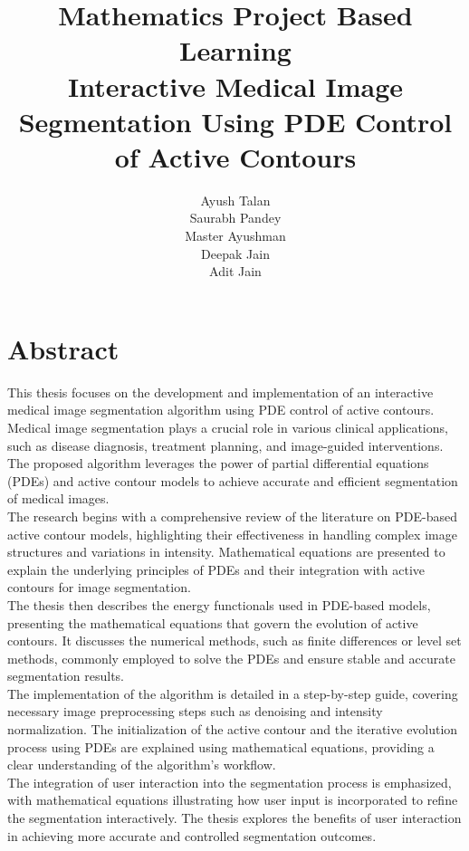 \documentclass[]{report}
\title{Mathematics Project Based Learning\\
{\Large Interactive Medical Image Segmentation Using
PDE Control of Active Contours}
}
\author{Ayush Talan\\Saurabh Pandey\\Master Ayushman\\Deepak Jain\\Adit Jain}
\begin{document}
\maketitle
\chapter*{Abstract}

This thesis focuses on the development and implementation of an interactive medical image segmentation algorithm using PDE control of active contours. Medical image segmentation plays a crucial role in various clinical applications, such as disease diagnosis, treatment planning, and image-guided interventions. The proposed algorithm leverages the power of partial differential equations (PDEs) and active contour models to achieve accurate and efficient segmentation of medical images.\\

The research begins with a comprehensive review of the literature on PDE-based active contour models, highlighting their effectiveness in handling complex image structures and variations in intensity. Mathematical equations are presented to explain the underlying principles of PDEs and their integration with active contours for image segmentation.\\

The thesis then describes the energy functionals used in PDE-based models, presenting the mathematical equations that govern the evolution of active contours. It discusses the numerical methods, such as finite differences or level set methods, commonly employed to solve the PDEs and ensure stable and accurate segmentation results.\\

The implementation of the algorithm is detailed in a step-by-step guide, covering necessary image preprocessing steps such as denoising and intensity normalization. The initialization of the active contour and the iterative evolution process using PDEs are explained using mathematical equations, providing a clear understanding of the algorithm's workflow.\\

The integration of user interaction into the segmentation process is emphasized, with mathematical equations illustrating how user input is incorporated to refine the segmentation interactively. The thesis explores the benefits of user interaction in achieving more accurate and controlled segmentation outcomes.\\
\end{document}
